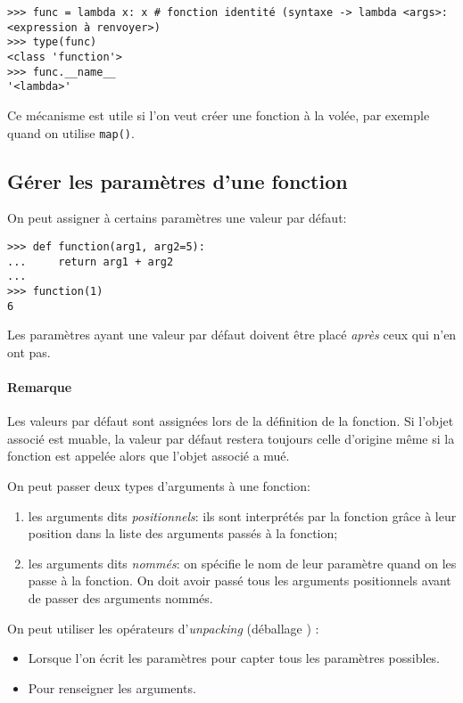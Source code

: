 \begin{verbatim}
>>> func = lambda x: x # fonction identité (syntaxe -> lambda <args>: <expression à renvoyer>)
>>> type(func)
<class 'function'>
>>> func.__name__
'<lambda>'
\end{verbatim}

Ce mécanisme est utile si l'on veut créer une fonction à la volée, par exemple quand on utilise \texttt{map()}.

\subsection{Gérer les paramètres d'une fonction}

On peut assigner à certains paramètres une valeur par défaut:

\begin{verbatim}
>>> def function(arg1, arg2=5):
...     return arg1 + arg2
... 
>>> function(1)
6
\end{verbatim}

Les paramètres ayant une valeur par défaut doivent être placé \emph{après} ceux qui n'en ont pas.

\paragraph*{Remarque} Les valeurs par défaut sont assignées lors de la définition de la fonction. Si l'objet associé est
muable, la valeur par défaut restera toujours celle d'origine même si la fonction est appelée alors que l'objet associé
a mué.\medskip

On peut passer deux types d'arguments à une fonction:
\begin{enumerate}
    \item les arguments dits \emph{positionnels}: ils sont interprétés par la fonction grâce à leur position dans
          la liste des arguments passés à la fonction;
    \item les arguments dits \emph{nommés}: on spécifie le nom de leur paramètre quand on les passe à la fonction.
          On doit avoir passé tous les arguments positionnels avant de passer des arguments nommés.
\end{enumerate}

On peut utiliser les opérateurs d'\emph{unpacking} (\og déballage \fg{}) :
\begin{itemize}
    \item Lorsque l'on écrit les paramètres pour capter tous les paramètres possibles.
    \item Pour renseigner les arguments.
\end{itemize}

